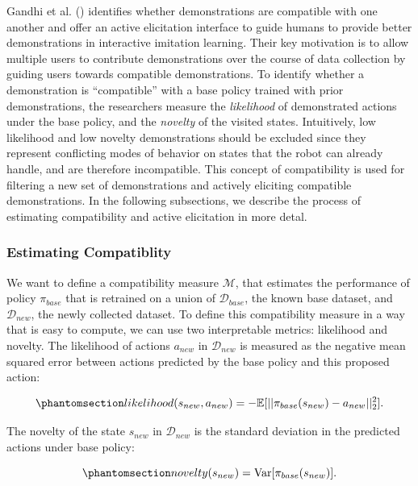 \documentclass[
  letterpaper,
  numbers=noenddot,
  DIV=11]{scrreprt}
\theoremstyle{definition}
\theoremstyle{plain}
\theoremstyle{plain}
\theoremstyle{remark}
\begin{document}
Gandhi et al. ()
identifies whether demonstrations are compatible with one another and
offer an active elicitation interface to guide humans to provide better
demonstrations in interactive imitation learning. Their key motivation
is to allow multiple users to contribute demonstrations over the course
of data collection by guiding users towards compatible demonstrations.
To identify whether a demonstration is ``compatible'' with a base policy
trained with prior demonstrations, the researchers measure the
\emph{likelihood} of demonstrated actions under the base policy, and the
\emph{novelty} of the visited states. Intuitively, low likelihood and
low novelty demonstrations should be excluded since they represent
conflicting modes of behavior on states that the robot can already
handle, and are therefore incompatible. This concept of compatibility is
used for filtering a new set of demonstrations and actively eliciting
compatible demonstrations. In the following subsections, we describe the
process of estimating compatibility and active elicitation in more
detal.

\subsubsection*{Estimating Compatiblity}\label{estimating-compatiblity}

We want to define a compatibility measure \(\mathcal{M}\), that
estimates the performance of policy \(\pi_{base}\) that is retrained on
a union of \(\mathcal{D}_{base}\), the known base dataset, and
\(\mathcal{D}_{new}\), the newly collected dataset. To define this
compatibility measure in a way that is easy to compute, we can use two
interpretable metrics: likelihood and novelty. The likelihood of actions
\(a_{new}\) in \(\mathcal{D}_{new}\) is measured as the negative mean
squared error between actions predicted by the base policy and this
proposed action:

\begin{equation}\phantomsection\label{eq-eq3.61}{likelihood(s_{new}, a_{new}) = -\mathbb{E}[|| \pi_{base}(s_{new}) - a_{new} ||^2_2].}\end{equation}

The novelty of the state \(s_{new}\) in \(\mathcal{D}_{new}\) is the
standard deviation in the predicted actions under base policy:

\begin{equation}\phantomsection\label{eq-eq3.62}{novelty(s_{new}) = \mathrm{Var}[\pi_{base}(s_{new})].}\end{equation}
\end{document}
